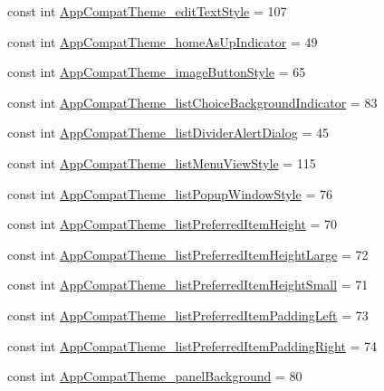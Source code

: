 \begin{CompactItemize}
\item 
const int \hyperlink{class__2doo_1_1_droid_1_1_resource_1_1_styleable_f6a3c460cad30c1ba97f61cd6353e0e8}{AppCompatTheme\_\-editTextStyle} = 107
\item 
const int \hyperlink{class__2doo_1_1_droid_1_1_resource_1_1_styleable_283a427b931763d89351c9a99351a0a0}{AppCompatTheme\_\-homeAsUpIndicator} = 49
\item 
const int \hyperlink{class__2doo_1_1_droid_1_1_resource_1_1_styleable_07fd5299d19787575a7efb9ced613ac5}{AppCompatTheme\_\-imageButtonStyle} = 65
\item 
const int \hyperlink{class__2doo_1_1_droid_1_1_resource_1_1_styleable_72e425bee7a2db9276f01312ad822ede}{AppCompatTheme\_\-listChoiceBackgroundIndicator} = 83
\item 
const int \hyperlink{class__2doo_1_1_droid_1_1_resource_1_1_styleable_556c4cbc59666197ed3cbd08b6db40c5}{AppCompatTheme\_\-listDividerAlertDialog} = 45
\item 
const int \hyperlink{class__2doo_1_1_droid_1_1_resource_1_1_styleable_4969ab71b0f6b6a8a0978f91b7e24d70}{AppCompatTheme\_\-listMenuViewStyle} = 115
\item 
const int \hyperlink{class__2doo_1_1_droid_1_1_resource_1_1_styleable_19276b236e48b2d5c44aea22a4998913}{AppCompatTheme\_\-listPopupWindowStyle} = 76
\item 
const int \hyperlink{class__2doo_1_1_droid_1_1_resource_1_1_styleable_5a13bf76658be745068c98426d31a1d9}{AppCompatTheme\_\-listPreferredItemHeight} = 70
\item 
const int \hyperlink{class__2doo_1_1_droid_1_1_resource_1_1_styleable_df60cc8fb2279b729dc593464a356448}{AppCompatTheme\_\-listPreferredItemHeightLarge} = 72
\item 
const int \hyperlink{class__2doo_1_1_droid_1_1_resource_1_1_styleable_6073bfea57257a2cf599be34039298ad}{AppCompatTheme\_\-listPreferredItemHeightSmall} = 71
\item 
const int \hyperlink{class__2doo_1_1_droid_1_1_resource_1_1_styleable_2e85417b270f66380b85cf0e70dfa5d8}{AppCompatTheme\_\-listPreferredItemPaddingLeft} = 73
\item 
const int \hyperlink{class__2doo_1_1_droid_1_1_resource_1_1_styleable_65aaa5499c54f73cde7e8b472ce168c0}{AppCompatTheme\_\-listPreferredItemPaddingRight} = 74
\item 
const int \hyperlink{class__2doo_1_1_droid_1_1_resource_1_1_styleable_6ace22b664aab2bfdfc7179df4a8a944}{AppCompatTheme\_\-panelBackground} = 80
\item 

\end{CompactItemize}
